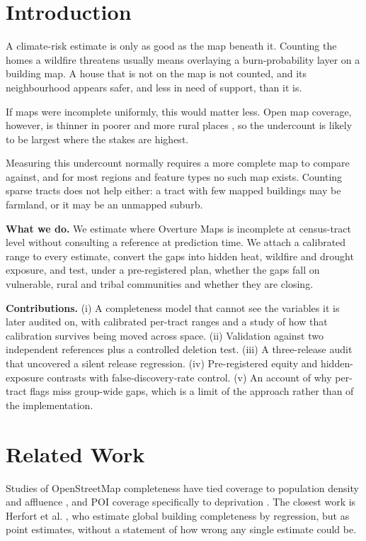 \documentclass[conference]{IEEEtran}
\begin{document}
\section{Introduction}
A climate-risk estimate is only as good as the map beneath it. Counting the homes a wildfire threatens usually means overlaying a burn-probability layer on a building map. A house that is not on the map is not counted, and its neighbourhood appears safer, and less in need of support, than it is.

If maps were incomplete uniformly, this would matter less. Open map coverage, however, is thinner in poorer and more rural places \cite{haklay2010,mashhadi2013,herfort2023}, so the undercount is likely to be largest where the stakes are highest.

Measuring this undercount normally requires a more complete map to compare against, and for most regions and feature types no such map exists. Counting sparse tracts does not help either: a tract with few mapped buildings may be farmland, or it may be an unmapped suburb.

\textbf{What we do.} We estimate where Overture Maps \cite{overture} is incomplete at census-tract level without consulting a reference at prediction time. We attach a calibrated range to every estimate, convert the gaps into hidden heat, wildfire and drought exposure, and test, under a pre-registered plan, whether the gaps fall on vulnerable, rural and tribal communities and whether they are closing.

\textbf{Contributions.} (i) A completeness model that cannot see the variables it is later audited on, with calibrated per-tract ranges and a study of how that calibration survives being moved across space. (ii) Validation against two independent references plus a controlled deletion test. (iii) A three-release audit that uncovered a silent release regression. (iv) Pre-registered equity and hidden-exposure contrasts with false-discovery-rate control. (v) An account of why per-tract flags miss group-wide gaps, which is a limit of the approach rather than of the implementation.

\section{Related Work}
Studies of OpenStreetMap completeness have tied coverage to population density and affluence \cite{haklay2010,thebaultspieker2018}, and POI coverage specifically to deprivation \cite{mashhadi2013}. The closest work is Herfort et al. \cite{herfort2023}, who estimate global building completeness by regression, but as point estimates, without a statement of how wrong any single estimate could be.
\end{document}
